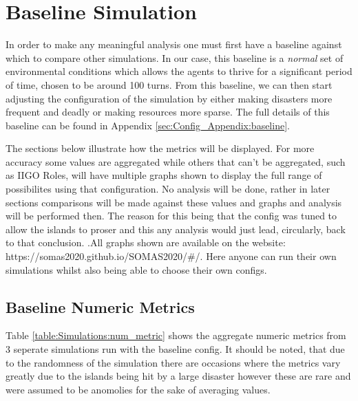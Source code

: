 \section{Baseline Simulation}
\label{sec:Simulations:baseline}

In order to make any meaningful analysis one must first have a baseline against which to compare other simulations. In our case, this baseline is a \emph{normal} set of environmental conditions which allows the agents to thrive for a significant period of time, chosen to be around 100 turns. From this baseline, we can then start adjusting the configuration of the simulation by either making disasters more frequent and deadly or making resources more sparse. The full details of this baseline can be found in Appendix \ref{sec:Config_Appendix:baseline}. 

The sections below illustrate how the metrics will be displayed. For more accuracy some values are aggregated while others that can't be aggregated, such as IIGO Roles, will have multiple graphs shown to display the full range of possibilites using that configuration. No analysis will be done, rather in later sections comparisons will be made against these values and graphs and analysis will be performed then. The reason for this being that the config was tuned to allow the islands to proser and this any analysis would just lead, circularly, back to that conclusion. .All graphs shown are available on the website: https://somas2020.github.io/SOMAS2020/\#/. Here anyone can run their own simulations whilst also being able to choose their own configs.

\subsection{Baseline Numeric Metrics}
\label{subsec:Simulations:baseline:num_metrics}

Table \ref{table:Simulations:num_metric} shows the aggregate numeric metrics from 3 seperate simulations run with the baseline config. It should be noted, that due to the randomness of the simulation there are occasions where the metrics vary greatly due to the islands being hit by a large disaster however these are rare and were assumed to be anomolies for the sake of averaging values.

